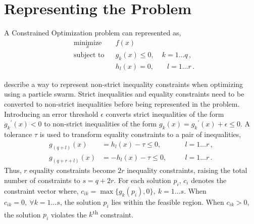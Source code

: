 \documentclass[10pt]{article}
\newcommand{\tsup}{\textsuperscript}
\begin{document}
\section{Representing the Problem}\label{sec:rep}

A Constrained Optimization problem can represented as,
\begin{equation*}
  \begin{aligned}
    & \underset{x}{\text{minimize}}
    & & f(x) \\
    & \text{subject to}
    & & g_k(x) \leq 0,&\; k = 1\dots q\,,\\
    &&& h_l(x) = 0,&\quad l = 1\dots r\,.
  \end{aligned}
\end{equation*}

\textcite{Cop} describe a way to represent non-strict inequality constraints when optimizing using a particle swarm.
Strict inequalities and equality constraints need to be converted to non-strict inequalities before being represented in
the problem. Introducing an error threshold $\epsilon$ converts strict inequalities of the form ${g_k}^{\prime}(x) < 0$
to non-strict inequalities of the form $g_k(x) = {g_k}^{\prime}(x) + \epsilon \leq 0$. A tolerance $\tau$ is used to
transform equality constraints to a pair of inequalities,
\begin{equation*}
  \begin{aligned}
    g_{(q+l)}(x) &= h_l(x) - \tau \leq 0,&&\quad l = 1\dots r\,,\\
    g_{(q+r+l)}(x) &= {-}h_l(x) - \tau \leq 0,&&\quad l = 1\dots r\,.
  \end{aligned}
\end{equation*}
Thus, $r$ equality constraints become $2r$ inequality constraints, raising the total number of constraints to $s = q +
2r$. For each solution $p_i$, $c_i$ denotes the constraint vector where, $c_{ik} = \max\{g_k(p_i), 0\},~k=1\dots s$.
When $c_{ik} = 0,~\forall k=1\dots s$, the solution $p_i$ lies within the feasible region. When $c_{ik} > 0$, the
solution $p_i$ violates the $k$\tsup{th} constraint.
\end{document}

